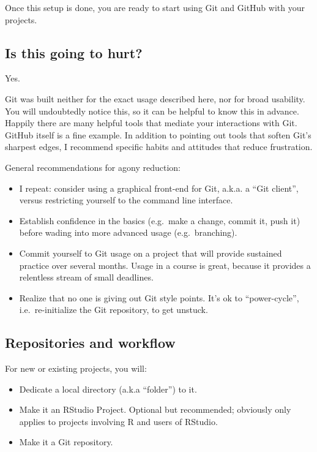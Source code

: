 \documentclass[12pt]{article}
\providecommand{\tightlist}{%
  \setlength{\itemsep}{0pt}\setlength{\parskip}{0pt}}
\begin{document}
Once this setup is done, you are ready to start using Git and GitHub
with your projects.

\subsection{Is this going to hurt?}\label{is-this-going-to-hurt}

Yes.

Git was built neither for the exact usage described here, nor for broad
usability. You will undoubtedly notice this, so it can be helpful to
know this in advance. Happily there are many helpful tools that mediate
your interactions with Git. GitHub itself is a fine example. In addition
to pointing out tools that soften Git's sharpest edges, I recommend
specific habits and attitudes that reduce frustration.

General recommendations for agony reduction:

\begin{itemize}
\tightlist
\item
  I repeat: consider using a graphical front-end for Git, a.k.a. a ``Git
  client'', versus restricting yourself to the command line interface.
\item
  Establish confidence in the basics (e.g.~make a change, commit it,
  push it) before wading into more advanced usage (e.g.~branching).
\item
  Commit yourself to Git usage on a project that will provide sustained
  practice over several months. Usage in a course is great, because it
  provides a relentless stream of small deadlines.
\item
  Realize that no one is giving out Git style points. It's ok to
  ``power-cycle'', i.e.~re-initialize the Git repository, to get
  unstuck.
\end{itemize}

\subsection{Repositories and workflow}\label{repositories-and-workflow}

For new or existing projects, you will:

\begin{itemize}
\tightlist
\item
  Dedicate a local directory (a.k.a ``folder'') to it.
\item
  Make it an RStudio Project. Optional but recommended; obviously only
  applies to projects involving R and users of RStudio.
\item
  Make it a Git repository.
\end{itemize}
\end{document}
